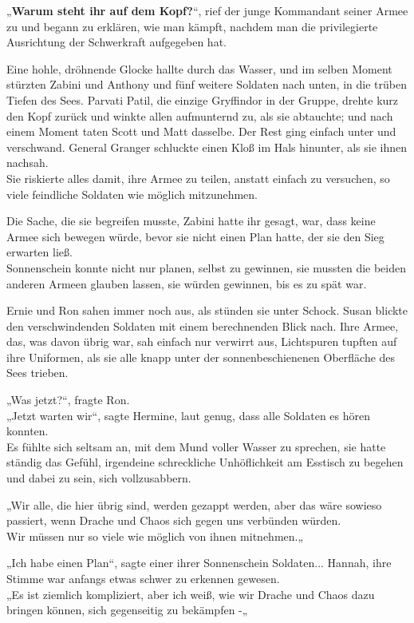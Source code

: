{„\textbf{Warum steht ihr auf dem Kopf?}“, rief der junge Kommandant seiner Armee zu und begann zu erklären, wie man kämpft, nachdem man die privilegierte Ausrichtung der Schwerkraft aufgegeben hat.

Eine hohle, dröhnende Glocke hallte durch das Wasser, und im selben Moment stürzten Zabini und Anthony und fünf weitere Soldaten nach unten, in die trüben Tiefen des Sees. Parvati Patil, die einzige Gryffindor in der Gruppe, drehte kurz den Kopf zurück und winkte allen aufmunternd zu, als sie abtauchte; und nach einem Moment taten Scott und Matt dasselbe. Der Rest ging einfach unter und verschwand. General Granger schluckte einen Kloß im Hals hinunter, als sie ihnen nachsah.\\ Sie riskierte alles damit, ihre Armee zu teilen, anstatt einfach zu versuchen, so viele feindliche Soldaten wie möglich mitzunehmen.

Die Sache, die sie begreifen musste, Zabini hatte ihr gesagt, war, dass keine Armee sich bewegen würde, bevor sie nicht einen Plan hatte, der sie den Sieg erwarten ließ.\\ Sonnenschein konnte nicht nur planen, selbst zu gewinnen, sie mussten die beiden anderen Armeen glauben lassen, sie würden gewinnen, bis es zu spät war.

Ernie und Ron sahen immer noch aus, als stünden sie unter Schock. Susan blickte den verschwindenden Soldaten mit einem berechnenden Blick nach. Ihre Armee, das, was davon übrig war, sah einfach nur verwirrt aus, Lichtspuren tupften auf ihre Uniformen, als sie alle knapp unter der sonnenbeschienenen Oberfläche des Sees trieben.

„Was jetzt?“, fragte Ron.\\ „Jetzt warten wir“, sagte Hermine, laut genug, dass alle Soldaten es hören konnten.\\ Es fühlte sich seltsam an, mit dem Mund voller Wasser zu sprechen, sie hatte ständig das Gefühl, irgendeine schreckliche Unhöflichkeit am Esstisch zu begehen und dabei zu sein, sich vollzusabbern.

„Wir alle, die hier übrig sind, werden gezappt werden, aber das wäre sowieso passiert, wenn Drache und Chaos sich gegen uns verbünden würden.\\ Wir müssen nur so viele wie möglich von ihnen mitnehmen.„

„Ich habe einen Plan“, sagte einer ihrer Sonnenschein Soldaten... Hannah, ihre Stimme war anfangs etwas schwer zu erkennen gewesen.\\ „Es ist ziemlich kompliziert, aber ich weiß, wie wir Drache und Chaos dazu bringen können, sich gegenseitig zu bekämpfen -„

}
